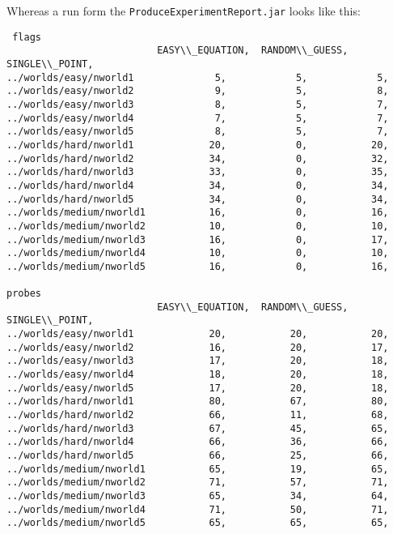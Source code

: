 \documentclass[british]{article}
\newcommand{\code}[1]{\texttt{#1}}
\begin{document}
 Whereas a run form the \code{ProduceExperimentReport.jar} looks like this:
 \begin{lstlisting}
 flags
                          EASY\\_EQUATION,  RANDOM\\_GUESS,  SINGLE\\_POINT,
../worlds/easy/nworld1              5,            5,            5,
../worlds/easy/nworld2              9,            5,            8,
../worlds/easy/nworld3              8,            5,            7,
../worlds/easy/nworld4              7,            5,            7,
../worlds/easy/nworld5              8,            5,            7,
../worlds/hard/nworld1             20,            0,           20,
../worlds/hard/nworld2             34,            0,           32,
../worlds/hard/nworld3             33,            0,           35,
../worlds/hard/nworld4             34,            0,           34,
../worlds/hard/nworld5             34,            0,           34,
../worlds/medium/nworld1           16,            0,           16,
../worlds/medium/nworld2           10,            0,           10,
../worlds/medium/nworld3           16,            0,           17,
../worlds/medium/nworld4           10,            0,           10,
../worlds/medium/nworld5           16,            0,           16,

probes
                          EASY\\_EQUATION,  RANDOM\\_GUESS,  SINGLE\\_POINT,
../worlds/easy/nworld1             20,           20,           20,
../worlds/easy/nworld2             16,           20,           17,
../worlds/easy/nworld3             17,           20,           18,
../worlds/easy/nworld4             18,           20,           18,
../worlds/easy/nworld5             17,           20,           18,
../worlds/hard/nworld1             80,           67,           80,
../worlds/hard/nworld2             66,           11,           68,
../worlds/hard/nworld3             67,           45,           65,
../worlds/hard/nworld4             66,           36,           66,
../worlds/hard/nworld5             66,           25,           66,
../worlds/medium/nworld1           65,           19,           65,
../worlds/medium/nworld2           71,           57,           71,
../worlds/medium/nworld3           65,           34,           64,
../worlds/medium/nworld4           71,           50,           71,
../worlds/medium/nworld5           65,           65,           65,


\end{lstlisting}
\end{document}
